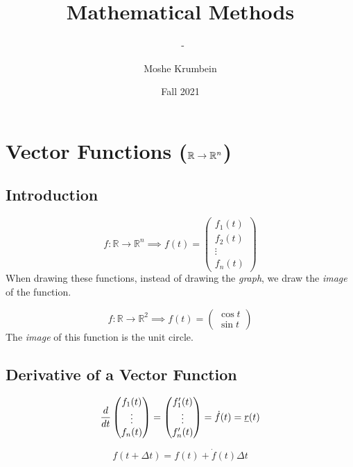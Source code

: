 \documentclass[00_complete]{subfiles}
\title{Mathematical Methods}
\author{Moshe Krumbein}
\date{Fall 2021}
\begin{document}
\setcounter{chapter}{8}

\chapter{Vector Functions
(\texorpdfstring{$\mathbb{R}\to\mathbb{R}^{\lowercase{n}}$}{R to Rn})}
\subtitle{\theauthor~- \thedate}
\section{Introduction}

\begin{definition}
    $$f: \mathbb{R} \to \mathbb{R}^n \implies f(t) = \begin{pmatrix}
        f_1(t) \\f_2(t)\\ \vdots \\ f_n(t)
    \end{pmatrix}$$
When drawing these functions, instead of drawing the \emph{graph}, we draw the
\emph{image} of the function.
\begin{example}
    $$f: \mathbb{R} \to \mathbb{R}^2 \implies f(t) = \begin{pmatrix}
        \cos t \\ \sin t
    \end{pmatrix}$$
    The \emph{image} of this function is the unit circle.
\end{example}
\end{definition}
\section{Derivative of a Vector Function}
\begin{definition}
    $$
    \begin{gathered}
        \dv{t}\begin{pmatrix}
            f_1(t)\\ \vdots \\ f_n(t)
        \end{pmatrix} = \begin{pmatrix}
            f_1'(t) \\ \vdots \\ f_n'(t)
        \end{pmatrix} = \dot f(t) = \underline r(t)
    \end{gathered}
    $$
\end{definition}
\begin{definition}
    $$f(t + \Delta t) = f(t) + \dot f(t)\Delta t$$
\end{definition}
\end{document}
